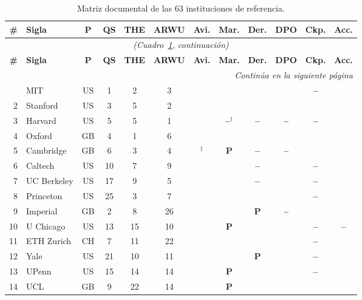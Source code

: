 \documentclass[pdflatex,sn-basic,Numbered]{sn-jnl}
\newcommand{\si}{\ding{51}}
\newcommand{\no}{\textcolor{gris}{\textbf{--}}}
\newcommand{\pc}{\textbf{P}}
\theoremstyle{thmstyleone}
\theoremstyle{thmstyletwo}
\theoremstyle{thmstylethree}
\begin{document}
\begin{appendices}
\scriptsize
\setlength{\tabcolsep}{2.6pt}
\begin{longtable}{@{}r l c c c c c c c c c c@{}}
	\caption{Matriz documental de las 63 instituciones de referencia.}\label{tab:mundo}\\
	\toprule
	\textbf{\#} & \textbf{Sigla} & \textbf{P} & \textbf{QS} & \textbf{THE} & \textbf{ARWU} & \textbf{Avi.} & \textbf{Mar.} & \textbf{Der.} & \textbf{DPO} & \textbf{Ckp.} & \textbf{Acc.} \\
	\midrule
	\endfirsthead
	\multicolumn{12}{c}{\textit{(Cuadro~\ref{tab:mundo}, continuaci\'on)}}\\
	\toprule
	\textbf{\#} & \textbf{Sigla} & \textbf{P} & \textbf{QS} & \textbf{THE} & \textbf{ARWU} & \textbf{Avi.} & \textbf{Mar.} & \textbf{Der.} & \textbf{DPO} & \textbf{Ckp.} & \textbf{Acc.} \\
	\midrule
	\endhead
	\midrule
	\multicolumn{12}{r}{\textit{Contin\'ua en la siguiente p\'agina}}\\
	\endfoot
	\bottomrule
	\endlastfoot
	1 & MIT & US & 1 & 2 & 3 & \si & \si & \si & \si & \no & \si \\
	2 & Stanford & US & 3 & 5 & 2 & \si & \si & \si & \si & \si & \si \\
	3 & Harvard & US & 5 & 5 & 1 & \si & \no$^\dagger$ & \no & \no & \no & \si \\
	4 & Oxford & GB & 4 & 1 & 6 & \si & \si & \si & \si & \si & \si \\
	5 & Cambridge & GB & 6 & 3 & 4 & \si$^\dagger$ & \pc & \no & \no & \si & \si \\
	6 & Caltech & US & 10 & 7 & 9 & \si & \si & \no & \si & \no & \si \\
	7 & UC Berkeley & US & 17 & 9 & 5 & \si & \si & \no & \si & \no & \si \\
	8 & Princeton & US & 25 & 3 & 7 & \si & \si & \si & \si & \no & \si \\
	9 & Imperial & GB & 2 & 8 & 26 & \si & \si & \pc & \no & \si & \si \\
	10 & U Chicago & US & 13 & 15 & 10 & \si & \pc & \si & \si & \no & \no \\
	11 & ETH Zurich & CH & 7 & 11 & 22 & \si & \si & \si & \si & \no & \si \\
	12 & Yale & US & 21 & 10 & 11 & \si & \si & \pc & \si & \no & \si \\
	13 & UPenn & US & 15 & 14 & 14 & \si & \pc & \si & \si & \no & \si \\
	14 & UCL & GB & 9 & 22 & 14 & \si & \pc & \si & \si & \si & \si \\

\end{longtable}
\end{appendices}
\end{document}
